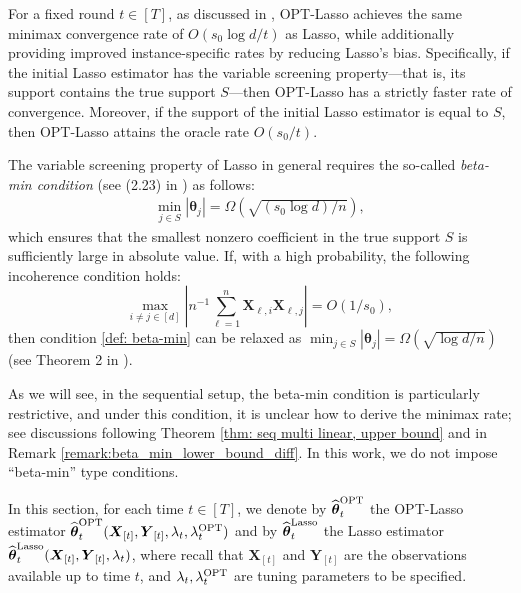 \documentclass[aos,preprint]{imsart}
\theoremstyle{plain}
\theoremstyle{definition}
\newcommand{\btheta}{\boldsymbol{\theta}}
\newcommand{\hbtheta}{\widehat{\boldsymbol{\theta}}}
\newcommand{\bX}{\boldsymbol{X}}
\newcommand{\ltheta}{\hbtheta^{\textup{Lasso}}}
\newcommand{\ptheta}{\widehat{\boldsymbol{\theta}}^{\textup{OPT}}}
\newcommand{\bY}{\boldsymbol{Y}}
\newcommand{\hdlambda}{\lambda^{\textup{OPT}}}
\begin{document}
For a fixed round $t \in [T]$, as discussed in \cite{belloni2013least}, OPT-Lasso achieves the same minimax convergence rate of $O(s_0 \log d/t)$ as Lasso, while additionally providing improved instance-specific rates by reducing Lasso’s bias. Specifically, if the initial Lasso estimator has the variable screening property---that is, its support contains the true support $S$---then OPT-Lasso has a strictly faster rate of convergence. Moreover, if the support of the initial Lasso estimator is equal to $S$, then OPT-Lasso attains the oracle rate $O(s_0/t)$. 

The variable screening property of Lasso in general requires the so-called \textit{beta-min condition} (see (2.23) in \cite{buhlmann2011statistics}) as follows:
\begin{align}\label{def: beta-min}
\min_{j \in S} |\btheta_j| = \Omega(\sqrt{(s_0 \log d)/n}),  
\end{align}
which ensures that the smallest nonzero coefficient in the true support $S$ is sufficiently large in absolute value. If, with a high probability, the following incoherence condition holds:
\begin{equation}\label{def:incoherence}
\max_{i\neq j\in[d]}|n^{-1}\sum_{\ell=1}^n{\bX_{\ell, i}\bX_{\ell, j}}| = O(1/s_0),
\end{equation}
then  condition \eqref{def: beta-min} can be relaxed as $\min_{j \in S} |\btheta_j| = \Omega(\sqrt{\log d/n})$ (see Theorem 2 in \cite{belloni2013least}).

As we will see, in the sequential setup, the beta-min condition is particularly restrictive, and under this condition, it is unclear how to derive the minimax rate; see discussions following Theorem \ref{thm: seq multi linear, upper bound} and in Remark \ref{remark:beta_min_lower_bound_diff}. In this work, we do not impose ``beta-min'' type conditions. 

In this section, for each time $t \in [T]$, we denote by $\ptheta_t$ the OPT-Lasso estimator $\ptheta_t(\bX_{[t]}, \bY_{[t]}, \lambda_t, \hdlambda_t)$ and by $\ltheta_t$ the Lasso estimator $\ltheta_t(\bX_{[t]}, \bY_{[t]}, \lambda_t)$, where recall that $\bX_{[t]}$ and $\bY_{[t]}$ are the observations available up to time $t$, and $\lambda_t, \hdlambda_t$ are tuning parameters to be specified.
\end{document}
